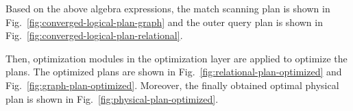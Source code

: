 {\begin{example}
    Based on the above algebra expressions, the match scanning plan is shown in Fig.~\ref{fig:converged-logical-plan-graph} and the outer query plan is shown in Fig.~\ref{fig:converged-logical-plan-relational}.

    Then, optimization modules in the optimization layer are applied to optimize the plans.
    The optimized plans are shown in Fig.~\ref{fig:relational-plan-optimized} and Fig.~\ref{fig:graph-plan-optimized}.
    Moreover, the finally obtained optimal physical plan is shown in Fig.~\ref{fig:physical-plan-optimized}.
\end{example}
}
